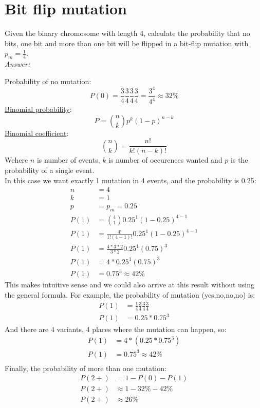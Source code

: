 \documentclass{article}           %
\begin{document}
\section{Bit flip mutation}
Given the binary chromosome with length 4, calculate the probability that no
bits, one bit and more than one bit will be flipped in a bit-flip mutation with
\(p_m = \frac{1}{4}\).\\

\emph{Answer:}

Probability of no mutation:
\begin{equation*}
    P(0) = \frac{3}{4} \frac{3}{4} \frac{3}{4} \frac{3}{4} = \frac{3^4}{4^4} \approx 32\%
\end{equation*}
\href{https://en.wikipedia.org/wiki/Binomial_distribution}{Binomial probability}:
\begin{equation}
    P = {n \choose k} p^k (1-p)^{n-k}
\end{equation}
\href{https://en.wikipedia.org/wiki/Binomial_coefficient}{Binomial coefficient}:
\begin{equation}
    {n \choose k} = \frac{n!}{k!(n-k)!}
\end{equation}
Wehere \(n\) is number of events, \(k\) is number of occurences wanted and \(p\) is the probability of a single event.\\

In this case we want exactly 1 mutation in 4 events, and the probability is 0.25:
\begin{align*}
    n &= 4\\
    k &= 1\\
    p &= p_m = 0.25\\
    P(1) &= {4 \choose 1} 0.25^1 (1-0.25)^{4-1}\\
    P(1) &= \frac{4!}{1!(4-1)!} 0.25^1 (1-0.25)^{4-1}\\
    P(1) &= \frac{4*3*2}{3*2} 0.25^1 (0.75)^{3}\\
    P(1) &= 4 * 0.25^1 (0.75)^{3}\\
    P(1) &= 0.75^3 \approx 42\%
\end{align*}
This makes intuitive sense and we could also arrive at this result without using the general formula.
For example, the probability of mutation (yes,no,no,no) is:
\begin{align*}
    P(1) &= \frac{1}{4} \frac{3}{4} \frac{3}{4} \frac{3}{4}\\
    P(1) &= 0.25 * 0.75^3
\end{align*}
And there are 4 variants, 4 places where the mutation can happen, so:
\begin{align*}
    P(1) &= 4 * (0.25 * 0.75^3)\\
    P(1) &= 0.75^3 \approx 42\%\\
\end{align*}
Finally, the probability of more than one mutation:
\begin{align*}
    P(2+) &= 1 - P(0) - P(1)\\
    P(2+) &\approx 1 - 32\% - 42\%\\
    P(2+) &\approx 26\%
\end{align*}
\end{document}
